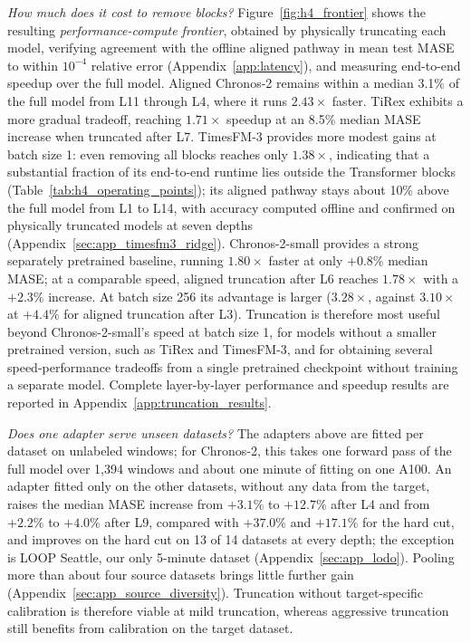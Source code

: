 \documentclass{article} %
\begin{document}
\textit{How much does it cost to remove blocks?} Figure~\ref{fig:h4_frontier} shows the resulting \textit{performance-compute frontier}, obtained by physically truncating each model, verifying agreement with the offline aligned pathway in mean test MASE to within $10^{-4}$ relative error (Appendix~\ref{app:latency}), and measuring end-to-end speedup over the full model. Aligned Chronos-2 remains within a median 3.1\% of the full model from L11 through L4, where it runs $2.43\times$ faster. TiRex exhibits a more gradual tradeoff, reaching $1.71\times$ speedup at an 8.5\% median MASE increase when truncated after L7. TimesFM-3 provides more modest gains at batch size 1: even removing all blocks reaches only $1.38\times$, indicating that a substantial fraction of its end-to-end runtime lies outside the Transformer blocks (Table~\ref{tab:h4_operating_points}); its aligned pathway stays about 10\% above the full model from L1 to L14, with accuracy computed offline and confirmed on physically truncated models at seven depths (Appendix~\ref{sec:app_timesfm3_ridge}). Chronos-2-small \citep{ansari2025chronos2univariateuniversalforecasting} provides a strong separately pretrained baseline, running $1.80\times$ faster at only $+0.8\%$ median MASE; at a comparable speed, aligned truncation after L6 reaches $1.78\times$ with a $+2.3\%$ increase. At batch size 256 its advantage is larger ($3.28\times$, against $3.10\times$ at $+4.4\%$ for aligned truncation after L3). Truncation is therefore most useful beyond Chronos-2-small's speed at batch size 1, for models without a smaller pretrained version, such as TiRex and TimesFM-3, and for obtaining several speed-performance tradeoffs from a single pretrained checkpoint without training a separate model. Complete layer-by-layer performance and speedup results are reported in Appendix~\ref{app:truncation_results}.

\textit{Does one adapter serve unseen datasets?} The adapters above are fitted per dataset on unlabeled windows; for Chronos-2, this takes one forward pass of the full model over 1,394 windows and about one minute of fitting on one A100. An adapter fitted only on the other datasets, without any data from the target, raises the median MASE increase from $+3.1\%$ to $+12.7\%$ after L4 and from $+2.2\%$ to $+4.0\%$ after L9, compared with $+37.0\%$ and $+17.1\%$ for the hard cut, and improves on the hard cut on 13 of 14 datasets at every depth; the exception is LOOP Seattle, our only 5-minute dataset (Appendix~\ref{sec:app_lodo}). Pooling more than about four source datasets brings little further gain (Appendix~\ref{sec:app_source_diversity}). Truncation without target-specific calibration is therefore viable at mild truncation, whereas aggressive truncation still benefits from calibration on the target dataset.
\end{document}
